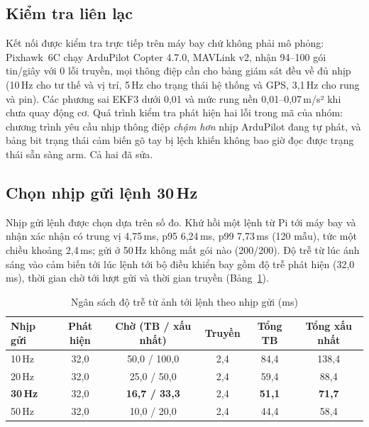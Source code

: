 \subsection{Kiểm tra liên lạc}

Kết nối được kiểm tra trực tiếp trên máy bay chứ không phải mô phỏng: Pixhawk~6C chạy ArduPilot Copter 4.7.0, MAVLink v2, nhận 94--100 gói tin/giây với 0 lỗi truyền, mọi thông điệp cần cho bảng giám sát đều về đủ nhịp (10\,Hz cho tư thế và vị trí, 5\,Hz cho trạng thái hệ thống và GPS, 3,1\,Hz cho rung và pin). Các phương sai EKF3 dưới 0,01 và mức rung nền 0,01--0,07\,m/s² khi chưa quay động cơ. Quá trình kiểm tra phát hiện hai lỗi trong mã của nhóm: chương trình yêu cầu nhịp thông điệp \textit{chậm hơn} nhịp ArduPilot đang tự phát, và bảng bit trạng thái cảm biến gõ tay bị lệch khiến không bao giờ đọc được trạng thái sẵn sàng arm. Cả hai đã sửa.

\subsection{Chọn nhịp gửi lệnh 30\,Hz}

Nhịp gửi lệnh được chọn dựa trên số đo. Khứ hồi một lệnh từ Pi tới máy bay và nhận xác nhận có trung vị 4,75\,ms, p95 6,24\,ms, p99 7,73\,ms (120 mẫu), tức một chiều khoảng 2,4\,ms; gửi ở 50\,Hz không mất gói nào (200/200). Độ trễ từ lúc ánh sáng vào cảm biến tới lúc lệnh tới bộ điều khiển bay gồm độ trễ phát hiện (32,0\,ms), thời gian chờ tới lượt gửi và thời gian truyền (Bảng~\ref{tab:nhiplenh}).

\begin{table}[H]
\centering
\caption{Ngân sách độ trễ từ ảnh tới lệnh theo nhịp gửi (ms)}
\label{tab:nhiplenh}
\small
\renewcommand{\arraystretch}{1.15}
\begin{tabular}{@{}lccccc@{}}
\toprule
\textbf{Nhịp gửi} & \textbf{Phát hiện} & \textbf{Chờ (TB / xấu nhất)} & \textbf{Truyền} & \textbf{Tổng TB} & \textbf{Tổng xấu nhất}\\
\midrule
10\,Hz & 32,0 & 50,0 / 100,0 & 2,4 & 84,4 & 138,4\\
20\,Hz & 32,0 & 25,0 / 50,0 & 2,4 & 59,4 & 88,4\\
\textbf{30\,Hz} & 32,0 & \textbf{16,7 / 33,3} & 2,4 & \textbf{51,1} & \textbf{71,7}\\
50\,Hz & 32,0 & 10,0 / 20,0 & 2,4 & 44,4 & 58,4\\
\bottomrule
\end{tabular}
\end{table}

